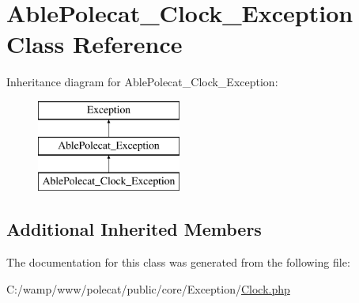 \hypertarget{class_able_polecat___clock___exception}{}\section{Able\+Polecat\+\_\+\+Clock\+\_\+\+Exception Class Reference}
\label{class_able_polecat___clock___exception}
Inheritance diagram for Able\+Polecat\+\_\+\+Clock\+\_\+\+Exception\+:\begin{figure}[H]
\begin{center}
\leavevmode
\includegraphics[height=3.000000cm]{class_able_polecat___clock___exception}
\end{center}
\end{figure}
\subsection*{Additional Inherited Members}


The documentation for this class was generated from the following file\+:\begin{DoxyCompactItemize}
\item 
C\+:/wamp/www/polecat/public/core/\+Exception/\hyperlink{_exception_2_clock_8php}{Clock.\+php}\end{DoxyCompactItemize}
